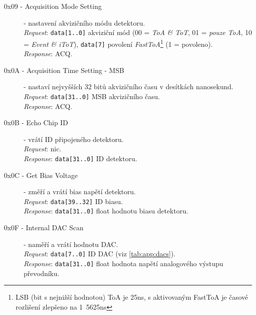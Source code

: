 \begin{description}
    \item[0x09 - Acquisition Mode Setting] - nastavení akvizičního módu detektoru.
    \\\textit{Request}: \texttt{data[1..0]} akviziční mód (00 = \textit{ToA \& ToT}, 01 = \textit{pouze ToA}, 10 = \textit{Event \& iToT}), \texttt{data[7]} povolení \textit{FastToA}\footnote{LSB (bit s nejnižší hodnotou) ToA je \unit{25}{ns}, s aktivovaným FastToA je časové rozlišení zlepšeno na \unit{1.5625}{ns}} (1 = povoleno).
    \\\textit{Response}: ACQ.

    \item[0x0A - Acquisition Time Setting - MSB] - nastaví nejvyšších 32 bitů akvizičního času v desítkách nanosekund.
    \\\textit{Request}: \texttt{data[31..0]} MSB akvizičního času.
    \\\textit{Response}: ACQ.

    \item[0x0B - Echo Chip ID] - vrátí ID připojeného detektoru.
    \\\textit{Request}: nic.
    \\\textit{Response}: \texttt{data[31..0]} ID detektoru.

    \item[0x0C - Get Bias Voltage] - změří a vrátí bias napětí detektoru.
    \\\textit{Request}: \texttt{data[39..32]} ID biasu.
    \\\textit{Response}: \texttt{data[31..0]} float hodnotu biasu detektoru.


    \item[0x0F - Internal DAC Scan] - naměří a vrátí hodnotu DAC.
    \\\textit{Request}: \texttt{data[7..0]} ID DAC (viz \ref{tab:app:dacs}).
    \\\textit{Response}: \texttt{data[31..0]} float hodnota napětí analogového výstupu převodníku.



\end{description}
